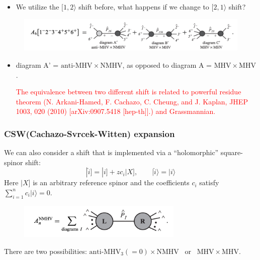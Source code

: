 \documentclass{beamer}
\newcommand{\aket}[1]{|#1\rangle}
\newcommand{\sket}[1]{|#1]}
\begin{document}
\begin{frame}
    \begin{itemize}
        \item We utilize the $[1,2\rangle$ shift before, what happens if we change to $[2,1\rangle$ shift?
    \end{itemize}
    \begin{figure}
            \centering
            \includegraphics[width=1\textwidth]{6ptNMHV2.png}
        \end{figure}
    \begin{itemize}
        \item[] diagram A' = $\mathrm{anti\text{-}MHV} \times \mathrm{NMHV}$, as opposed to diagram A = $\mathrm{MHV}\times \mathrm{MHV}$. 
        \vspace{1em}

        \textcolor{red}{The equivalence between two different shift is related to powerful residue theorem (N. Arkani-Hamed, F. Cachazo, C. Cheung, and J. Kaplan,
        JHEP 1003, 020 (2010) [arXiv:0907.5418 [hep-th]].) and Grassmannian.}
    \end{itemize}
\end{frame}
\begin{frame}
    \frametitle{CSW(Cachazo-Svrcek-Witten) expansion}
    We can also consider a shift that is implemented via a “holomorphic” square-spinor shift:
    \begin{equation*}
        \sket{\hat{i}}=\sket{i}+zc_i\sket{X},\qquad \aket{\hat{i}}=\aket{i}
    \end{equation*}
    Here $\sket{X}$ is an arbitrary reference spinor and the coefficients $c_i$ satisfy $\sum_{i=1}^{n} c_i \aket{i} = 0$.
    \begin{figure}
        \centering
        \includegraphics[width=0.7\textwidth]{NMHV.png}
    \end{figure}
    There are two possibilities: $\mathrm{anti\text{-}MHV_3}(=0)\times \mathrm{NMHV}$ ~or~ $\mathrm{MHV}\times\mathrm{MHV}$.
\end{frame}
\end{document}
